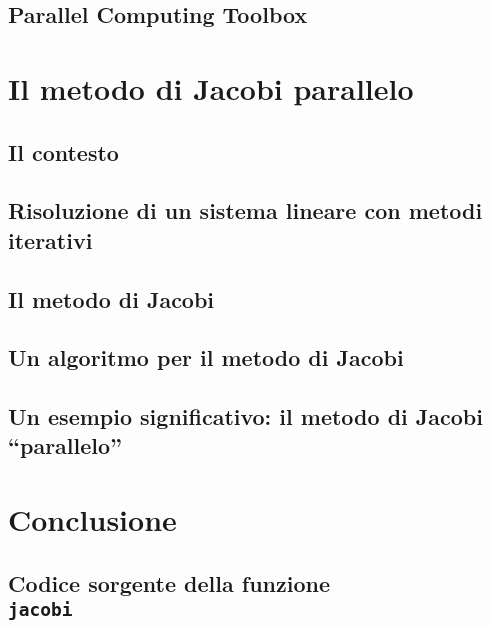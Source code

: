 \documentclass[
	a4paper,
	twoside,
	12pt
]{book}
\begin{document}
\section{Parallel Computing Toolbox}
\label{par2.2}

\chapter{Il metodo di Jacobi parallelo}
\label{cap:metodoJacobiParallelo}

\section{Il contesto}
\label{par:contestoMetodoJacobi}

\section{Risoluzione di un sistema lineare con metodi iterativi}

\section{Il metodo di Jacobi}
\label{par:metodoJacobi}

\section{Un algoritmo per il metodo di Jacobi}
\label{par:algoritmoJacobi}

\section{Un esempio significativo: il metodo di Jacobi \enquote{parallelo}}
\label{par:applicazioneMetodoJacobi}

\nocite{MathWorksIterativeMethods}
\chapter*{Conclusione}
\label{cap:conclusione}

\begin{appendix}
\chapter[Codice sorgente della funzione jacobi]{Codice sorgente della funzione \\ \texttt{jacobi}}
\label{app:codiceSorgenteJacobi}

\end{appendix}
\backmatter
\printbibliography[heading=bibintoc, title={Bibliografia}]
\end{document}

